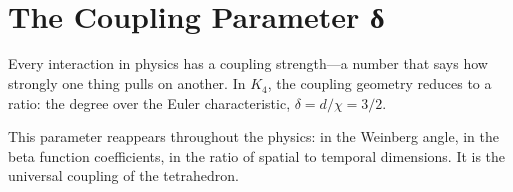 \documentclass[11pt,a4paper]{book}
\def\texorpdfstring#1#2{#2}%
\begin{document}
\begin{code}%
\>[0]\<%
\\
%
\\[\AgdaEmptyExtraSkip]%
\>[0]\AgdaSpace{}%
\AgdaSymbol{:}\AgdaSpace{}%
\<%
\\
\>[0]\AgdaSpace{}%
\AgdaSymbol{=}\AgdaSpace{}%
\<%
\\
%
\\[\AgdaEmptyExtraSkip]%
\>[0]\AgdaSpace{}%
\AgdaSymbol{:}\AgdaSpace{}%
\<%
\\
\>[0]\AgdaSpace{}%
\AgdaSymbol{=}\AgdaSpace{}%
\<%
\\
%
\\[\AgdaEmptyExtraSkip]%
\>[0]\AgdaSpace{}%
\AgdaSymbol{:}\AgdaSpace{}%
\AgdaSpace{}%
\AgdaSpace{}%
\<%
\\
\>[0]\AgdaSpace{}%
\AgdaSymbol{=}\AgdaSpace{}%
\<%
\end{code}

\section{The Coupling Parameter \texorpdfstring{$\delta$}{δ}}

Every interaction in physics has a coupling strength---a number that says how strongly one thing pulls on another. In $K_4$, the coupling geometry reduces to a ratio: the degree over the Euler characteristic, $\delta = d/\chi = 3/2$.

This parameter reappears throughout the physics: in the Weinberg angle, in the beta function coefficients, in the ratio of spatial to temporal dimensions. It is the universal coupling of the tetrahedron.
\end{document}
